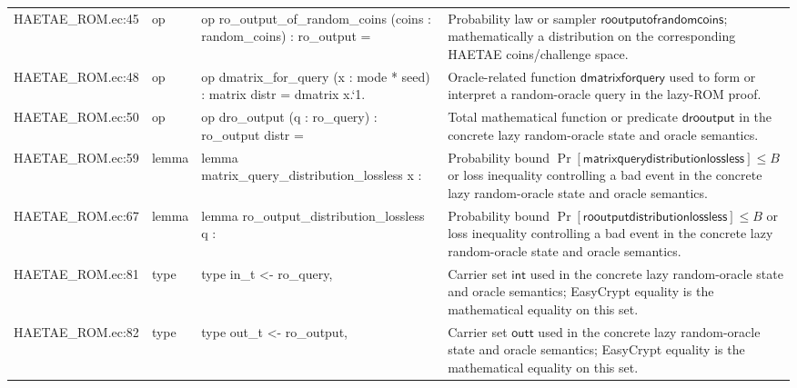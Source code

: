 \documentclass[10pt]{article}
\begin{document}
\begin{longtable}{L{0.11\textwidth}L{0.055\textwidth}L{0.385\textwidth}L{0.41\textwidth}}
HAETAE\_\allowbreak{}ROM.\allowbreak{}ec:\allowbreak{}45 & op & {\ttfamily\scriptsize op ro\_\allowbreak{}output\_\allowbreak{}of\_\allowbreak{}random\_\allowbreak{}coins (coins : random\_\allowbreak{}coins) : ro\_\allowbreak{}output =} & Probability law or sampler $\mathsf{rooutputofrandomcoins}$; mathematically a distribution on the corresponding HAETAE coins/challenge space. \\
HAETAE\_\allowbreak{}ROM.\allowbreak{}ec:\allowbreak{}48 & op & {\ttfamily\scriptsize op dmatrix\_\allowbreak{}for\_\allowbreak{}query (x : mode * seed) : matrix distr = dmatrix x.`1.} & Oracle-related function $\mathsf{dmatrixforquery}$ used to form or interpret a random-oracle query in the lazy-ROM proof. \\
HAETAE\_\allowbreak{}ROM.\allowbreak{}ec:\allowbreak{}50 & op & {\ttfamily\scriptsize op dro\_\allowbreak{}output (q : ro\_\allowbreak{}query) : ro\_\allowbreak{}output distr =} & Total mathematical function or predicate $\mathsf{drooutput}$ in the concrete lazy random-oracle state and oracle semantics. \\
HAETAE\_\allowbreak{}ROM.\allowbreak{}ec:\allowbreak{}59 & lemma & {\ttfamily\scriptsize lemma matrix\_\allowbreak{}query\_\allowbreak{}distribution\_\allowbreak{}lossless x :} & Probability bound $\Pr[\mathsf{matrixquerydistributionlossless}]\le B$ or loss inequality controlling a bad event in the concrete lazy random-oracle state and oracle semantics. \\
HAETAE\_\allowbreak{}ROM.\allowbreak{}ec:\allowbreak{}67 & lemma & {\ttfamily\scriptsize lemma ro\_\allowbreak{}output\_\allowbreak{}distribution\_\allowbreak{}lossless q :} & Probability bound $\Pr[\mathsf{rooutputdistributionlossless}]\le B$ or loss inequality controlling a bad event in the concrete lazy random-oracle state and oracle semantics. \\
HAETAE\_\allowbreak{}ROM.\allowbreak{}ec:\allowbreak{}81 & type & {\ttfamily\scriptsize type in\_\allowbreak{}t \textless{}- ro\_\allowbreak{}query,} & Carrier set $\mathsf{int}$ used in the concrete lazy random-oracle state and oracle semantics; EasyCrypt equality is the mathematical equality on this set. \\
HAETAE\_\allowbreak{}ROM.\allowbreak{}ec:\allowbreak{}82 & type & {\ttfamily\scriptsize type out\_\allowbreak{}t \textless{}- ro\_\allowbreak{}output,} & Carrier set $\mathsf{outt}$ used in the concrete lazy random-oracle state and oracle semantics; EasyCrypt equality is the mathematical equality on this set. \\

\end{longtable}
\end{document}
